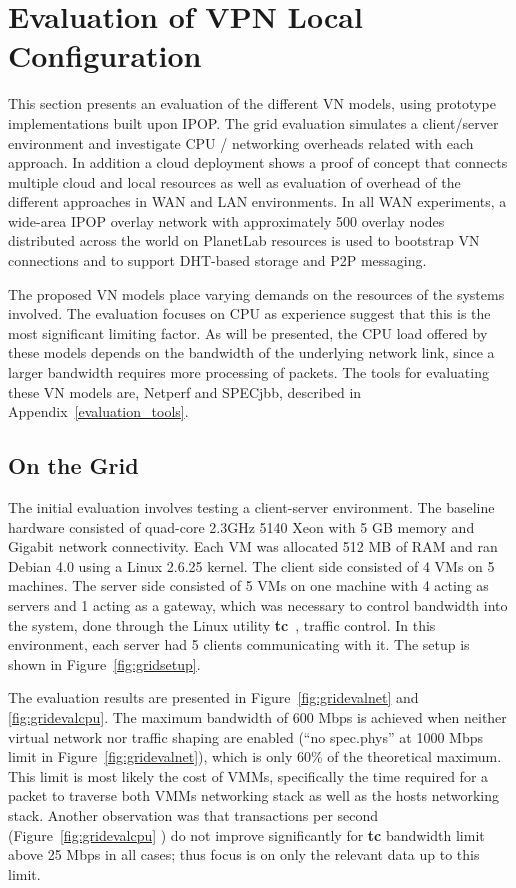 \section{Evaluation of VPN Local Configuration}
This section presents an evaluation of the different VN models, using prototype
implementations built upon IPOP.  The grid evaluation simulates a client/server
environment and investigate CPU / networking overheads related with each
approach.  In addition a cloud deployment shows a proof of concept that connects
multiple cloud and local resources as well as evaluation of overhead of the
different approaches in WAN and LAN environments.  In all WAN experiments, a
wide-area IPOP overlay network with approximately 500 overlay nodes distributed
across the world on PlanetLab resources is used to bootstrap VN connections and
to support DHT-based storage and P2P messaging.

The proposed VN models place varying demands on the resources of the systems
involved. The evaluation focuses on CPU as experience suggest that this is the
most significant limiting factor.  As will be presented, the CPU load offered
by these models depends on the bandwidth of the underlying network link, since
a larger bandwidth requires more processing of packets.  The tools for
evaluating these VN models are, Netperf and SPECjbb, described in
Appendix~\ref{evaluation_tools}.

\subsection{On the Grid}
The initial evaluation involves testing a client-server environment.  The
baseline hardware consisted of quad-core 2.3GHz 5140 Xeon with 5 GB memory and
Gigabit network connectivity.  Each VM was allocated 512 MB of RAM and ran
Debian 4.0 using a Linux 2.6.25 kernel.  The client side consisted of 4 VMs on
5 machines.  The server side consisted of 5 VMs on one machine with 4 acting
as servers and 1 acting as a gateway, which was necessary to control bandwidth
into the system, done through the Linux utility \textbf{tc}~\cite{tc}, traffic
control.  In this environment, each server had 5 clients communicating with it.
The setup is shown in Figure~\ref{fig:gridsetup}.

The evaluation results are presented in Figure~\ref{fig:gridevalnet} and
\ref{fig:gridevalcpu}.  The maximum bandwidth of 600 Mbps is achieved when
neither virtual network nor traffic shaping are enabled (``no spec.phys'' at
1000 Mbps limit in Figure~\ref{fig:gridevalnet}),
which is only 60\% of the theoretical maximum.  This limit is most likely the
cost of VMMs, specifically the time required for a packet to traverse both VMMs
networking stack as well as the hosts networking stack.  Another observation
was that transactions per second (Figure~\ref{fig:gridevalcpu}
) do not improve significantly for \textbf{tc} bandwidth
limit above 25 Mbps in all cases; thus focus is on only the relevant data up to
this limit.

